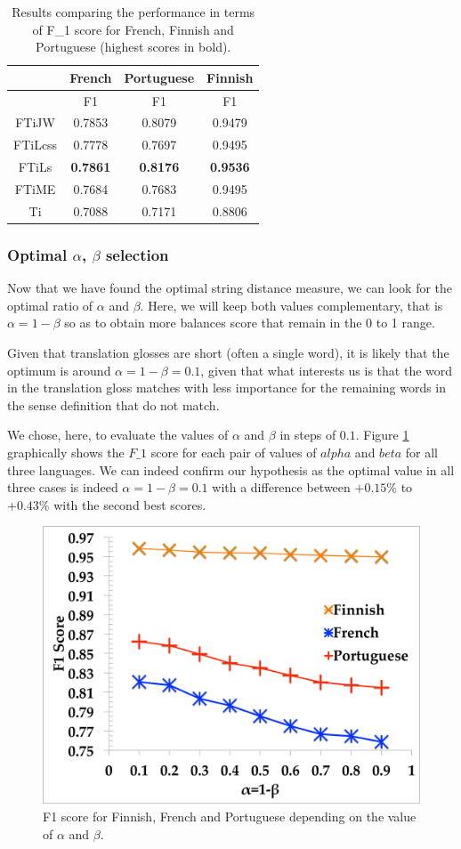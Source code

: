 \documentclass[10pt,a4paper,twoside]{article}
\begin{document}
\begin{table}
{\centering \footnotesize
\begin{tabular}{|c|c|c|c|}
\hline &French&Portuguese&Finnish\\
\hline &F1&F1&F1\\
\hline FTiJW&0.7853&0.8079&0.9479\\
\hline FTiLcss&0.7778&0.7697&0.9495\\
\hline FTiLs&\textbf{0.7861}&\textbf{0.8176}&\textbf{0.9536}\\
\hline FTiME&0.7684&0.7683&0.9495\\
\hline Ti&0.7088&0.7171&0.8806\\
\hline 
\end{tabular} 
\caption{Results comparing the performance in terms of F\_1 score for French, Finnish and Portuguese (highest scores in bold).}
\label{tab:expe1}
}
\end{table}

\subsubsection{Optimal \(\alpha\), \(\beta\) selection}
Now that we have found the optimal string distance measure, we can look for the optimal ratio of \(\alpha\) and \(\beta\). Here, we will keep both values complementary, that is \(\alpha=1-\beta\) so as to obtain more balances score that remain in the 0 to 1 range. 

Given that translation glosses are short (often a single word), it is likely that the optimum is around \(\alpha=1-\beta=0.1\), given that what interests us is  that the word in the translation gloss matches with less importance for the remaining words in the sense definition that do not match.

We chose, here, to evaluate the values of \(\alpha\) and \(\beta\) in steps of \(0.1\). Figure \ref{fig.1} graphically shows the \(F\_1\) score for each pair of values of \(alpha\) and \(beta\) for all three languages. We can indeed confirm our hypothesis as the optimal value in all three cases is indeed \(\alpha=1-\beta=0.1\) with a difference between \(+0.15\%\) to \(+0.43\%\) with the second best scores.
	
\begin{figure}\centering
\includegraphics[width=0.45\columnwidth]{alphabetafig}
\caption{F1 score for Finnish, French and Portuguese depending on the value of \(\alpha\) and \(\beta\).}
\label{fig.1}
\end{figure}
\end{document}
